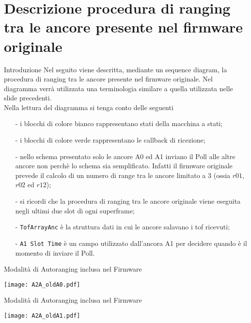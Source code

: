 \section{Descrizione procedura di ranging tra le ancore presente nel firmware originale}
\begin{frame}[shrink=10]{Introduzione}
  Nel seguito viene descritta, mediante un sequence diagram, la procedura di ranging tra le ancore
  presente nel firmware originale. Nel diagramma verrà utilizzata una terminologia similare a quella utilizzata nelle slide precedenti.\\
  Nella lettura del diagramma si tenga conto delle seguenti
  \begin{itemize}
  \item[-] i blocchi di colore bianco rappresentano stati della macchina a stati;
  \item[-] i blocchi di colore verde rappresentano le callback di ricezione;
  \item[-] nello schema presentato \alert{solo} le ancore A0 ed A1 inviano il Poll alle altre ancore
    non perchè lo schema sia semplificato. Infatti il firmware originale prevede
    il calcolo di un numero di range tra le ancore limitato a $3$ (ossia $r01$, $r02$ ed $r12$);
  \item[-] si ricordi che la procedura di ranging tra le ancore originale viene eseguita negli ultimi
    due slot di ogni superframe;
  \item[-] \lstinline!TofArrayAnc! è la struttura dati in cui le ancore salavano i tof ricevuti;
  \item[-] \lstinline!A1 Slot Time! è un campo utilizzato dall'ancora A1 per decidere quando è il momento
    di inviare il Poll.
  \end{itemize}
  
\end{frame}

\begin{frame}{Modalità di Autoranging inclusa nel Firmware}  
  \begin{center}
    \texttt{[image: A2A\_oldA0.pdf]}
  \end{center}
\end{frame}

\begin{frame}{Modalità di Autoranging inclusa nel Firmware}
  \begin{center}
    \texttt{[image: A2A\_oldA1.pdf]}
  \end{center}
\end{frame}

